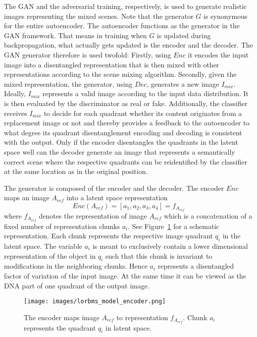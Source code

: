 \documentclass[a4paper,12pt]{report}
\begin{document}
The GAN and the adversarial training, respectively, is used to generate realistic images representing the mixed scenes. Note that the generator $G$ is synonymous for the entire autoencoder. The autoencoder functions as the generator in the GAN framework. That means in training when $G$ is updated during backpropagation, what actually gets updated is the encoder and the decoder. The GAN generator therefore is used twofold: Firstly, using $Enc$ it encodes the input image into a disentangled representation that is then mixed with other representations according to the scene mixing algorithm. Secondly, given the mixed representation, the generator, using $Dec$, generates a new image $I_{mix}$. Ideally, $I_{mix}$ represents a valid image according to the input data distribution. It is then evaluated by the discriminator as real or fake. Additionally, the classifier receives $I_{mix}$ to decide for each quadrant whether its content originates from a replacement image or not and thereby provides a feedback to the autoencoder to what degree its quadrant disentanglement encoding and decoding is consistent with the output. Only if the encoder disentangles the quadrants in the latent space well can the decoder generate an image that represents a semantically correct scene where the respective quadrants can be reidentified by the classifier at the same location as in the original position. 

The generator is composed of the encoder and the decoder. The encoder $Enc$ maps an image $A_{ref}$ into a latent space representation
\begin{equation} \label{eq:2}
    Enc(A_{ref}) = [a_1, a_2, a_3, a_4] = f_{A_{ref}}
\end{equation}
where $f_{A_{ref}}$ denotes the representation of image $A_{ref}$ which is a concatenation of a fixed number of representation chunks $a_i$. See Figure~\ref{fig:encoder} for a schematic representation. Each chunk represents the respective image quadrant $q_i$ in the latent space. The variable $a_i$ is meant to exclusively contain a lower dimensional representation of the object in $q_i$ such that this chunk is invariant to modifications in the neighboring chunks. Hence $a_i$ represents a disentangled factor of variation of the input image. At the same time it can be viewed as the DNA part of one quadrant of the output image.

\begin{figure}[ht]
\centering
\texttt{[image: images/lorbms\_model\_encoder.png]}
\caption[Schematic of the encoder.]{The encoder maps image $A_{ref}$ to representation $f_{A_{ref}}$. Chunk $a_i$ represents the quadrant $q_i$ in latent space.}
\label{fig:encoder}
\end{figure}
\end{document}
